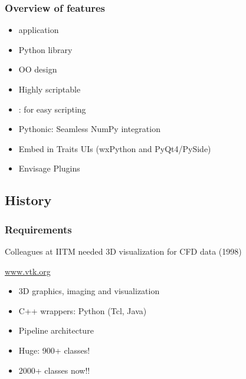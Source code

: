 \begin{frame}
  \frametitle{Overview of features}
  \begin{itemize}
  \item {} application
  \item Python library
  \item OO design
  \item Highly scriptable
  \item {}: for easy scripting
  \item \alert{Pythonic}: Seamless NumPy integration
  \item Embed in Traits UIs (wxPython and PyQt4/PySide)
  \item Envisage Plugins
  \end{itemize}
\end{frame}

\subsection{History}

\begin{frame}
    \frametitle{Requirements}
    \Large
    \begin{center}
        Colleagues at IITM needed 3D visualization for CFD data (1998)
    \end{center}
\end{frame}

\begin{frame}[plain]
    \Large
    \begin{center}
    \end{center}
\end{frame}

\begin{frame}
\Huge
\begin{center}
    \vspace*{1in}
    \url{www.vtk.org}
\end{center}
\end{frame}

\begin{frame}
    \Large
    \begin{itemize}
    \item 3D graphics, imaging and visualization
    \item C++ wrappers:  Python (Tcl, Java)
    \item Pipeline architecture
    \item Huge: 900+ classes!
    \item 2000+ classes now!!
    \end{itemize}
\end{frame}

